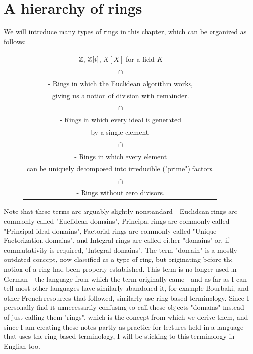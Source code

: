 \documentclass[10pt]{report}
\theoremstyle{definition}
\begin{document}
	\section{A hierarchy of rings}
	We will introduce many types of rings in this chapter, which can be organized as follows:
	\begin{figure}[h!]
		\centering
		\begin{tabular}{c}
			$\mathbb{Z}$, $\mathbb{Z}[i]$, $K[X]$ for a field $K$\\
			$\cap$\\
			\tbf{Euclidean Rings} - Rings in which the Euclidean algorithm
			works,\\ 
			giving us a notion of division with remainder.\\
			$\cap$\\
			\tbf{Principal Rings} - Rings in which every ideal is generated\\
			by a single element.\\
			$\cap$\\
			\tbf{Factorial Rings} - Rings in which every element\\ 
			can be uniquely decomposed into irreducible ("prime") factors.\\
			$\cap$\\
			\tbf{Integral Rings} - Rings without zero divisors.
		\end{tabular}
	\end{figure}
	\FloatBarrier
	Note that these terms are arguably slightly nonstandard - Euclidean rings are commonly called "Euclidean domains", Principal rings are commonly called "Principal ideal domains", Factorial rings are commonly called "Unique Factorization domains", and Integral rings are called either "domains" or, if commutativity is required, "Integral domains".
	\newpar
	The term "domain" is a mostly outdated concept, now classified as a type of ring, but originating before the notion of a ring had been properly established. This term is no longer used in German - the language from which the term originally came - and as far as I can tell most other languages have similarly abandoned it, for example Bourbaki, and other French resources that followed, similarly use ring-based terminology. 
	\newpar
	Since I personally find it unnecessarily confusing to call these objects "domains" instead of just calling them "rings", which is the concept from which we derive them, and since I am creating these notes partly as practice for lectures held in a language that uses the ring-based terminology, I will be sticking to this terminology in English too.
	
\end{document}
